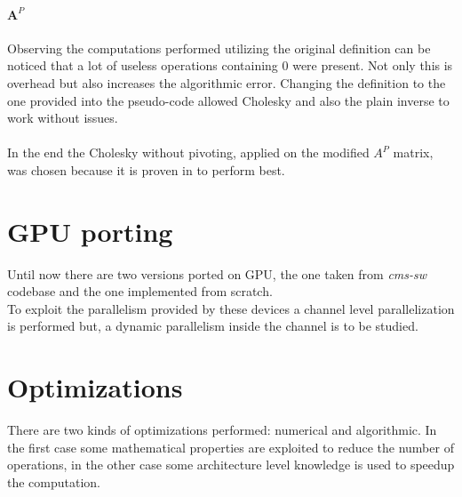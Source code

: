 \paragraph{$\boldsymbol A^P$} Observing the computations performed utilizing the original definition can be noticed that a lot of useless operations containing $0$ were present. Not only this is overhead but also increases the algorithmic error. Changing the definition to the one provided into the pseudo-code allowed Cholesky and also the plain inverse to work without issues.
\paragraph*{}
In the end the Cholesky without pivoting, applied on the modified $A^P$ matrix, was chosen because it is proven in \cite{Lee_numericallyefficient} to perform best.\\

\section{GPU porting}
Until now there are two versions ported on GPU, the one taken from \textit{cms-sw} codebase and the one implemented from scratch.\\
To exploit the parallelism provided by these devices a channel level parallelization is performed but, a dynamic parallelism inside the channel is to be studied.%

\section{Optimizations}
There are two kinds of optimizations performed: numerical and algorithmic. In the first case some mathematical properties are exploited to reduce the number of operations, in the other case some architecture level knowledge is used to speedup the computation.
